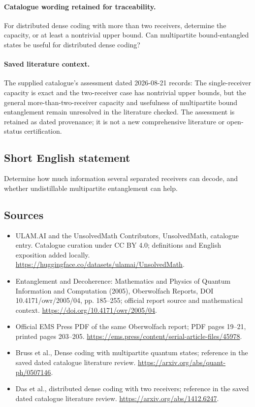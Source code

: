 \documentclass[11pt]{article}
\begin{document}
\paragraph{Catalogue wording retained for traceability.}
For distributed dense coding with more than two receivers, determine the capacity, or at least a nontrivial upper bound. Can multipartite bound-entangled states be useful for distributed dense coding?

\paragraph{Saved literature context.} The supplied catalogue's assessment dated 2026-08-21 records: The single-receiver capacity is exact and the two-receiver case has nontrivial upper bounds, but the general more-than-two-receiver capacity and usefulness of multipartite bound entanglement remain unresolved in the literature checked. The assessment is retained as dated provenance; it is not a new comprehensive literature or open-status certification.
\subsection{Short English statement}
Determine how much information several separated receivers can decode, and whether undistillable multipartite entanglement can help.
\subsection{Sources}
\begin{itemize}
\item[\hypertarget{source:statement:1}{S1}] ULAM.AI and the UnsolvedMath Contributors, UnsolvedMath, catalogue entry. Catalogue curation under CC BY 4.0; definitions and English exposition added locally.
\url{https://huggingface.co/datasets/ulamai/UnsolvedMath}.
\item[\hypertarget{source:statement:2}{S2}] Entanglement and Decoherence: Mathematics and Physics of Quantum Information and Computation (2005), Oberwolfach Reports, DOI 10.4171/owr/2005/04, pp. 185--255; official report source and mathematical context.
\url{https://doi.org/10.4171/owr/2005/04}.
\item[\hypertarget{source:statement:3}{S3}] Official EMS Press PDF of the same Oberwolfach report; PDF pages 19--21, printed pages 203--205.
\url{https://ems.press/content/serial-article-files/45978}.
\item[\hypertarget{source:statement:4}{S4}] Bruss et al., Dense coding with multipartite quantum states; reference in the saved dated catalogue literature review.
\url{https://arxiv.org/abs/quant-ph/0507146}.
\item[\hypertarget{source:statement:5}{S5}] Das et al., distributed dense coding with two receivers; reference in the saved dated catalogue literature review.
\url{https://arxiv.org/abs/1412.6247}.
\end{itemize}
\label{end:statement}
\end{document}
